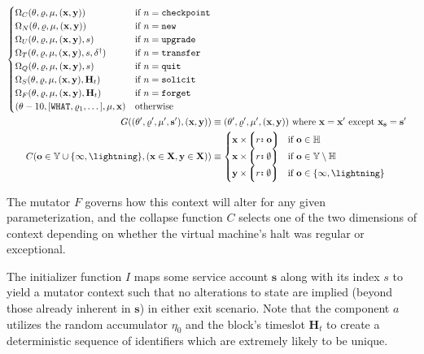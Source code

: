 \begin{align}
\begin{cases}
    \Omega_C(\theta, \varrho, \mu, (\mathbf{x}, \mathbf{y})) &\when n = \mathtt{checkpoint} \\
    \Omega_N(\theta, \varrho, \mu, (\mathbf{x}, \mathbf{y})) &\when n = \mathtt{new} \\
    \Omega_U(\theta, \varrho, \mu, (\mathbf{x}, \mathbf{y}), s) &\when n = \mathtt{upgrade} \\
    \Omega_T(\theta, \varrho, \mu, (\mathbf{x}, \mathbf{y}), s, \delta^\dagger) &\when n = \mathtt{transfer} \\
    \Omega_Q(\theta, \varrho, \mu, (\mathbf{x}, \mathbf{y}), s) &\when n = \mathtt{quit} \\
    \Omega_S(\theta, \varrho, \mu, (\mathbf{x}, \mathbf{y}), \mathbf{H}_t) &\when n = \mathtt{solicit} \\
    \Omega_F(\theta, \varrho, \mu, (\mathbf{x}, \mathbf{y}), \mathbf{H}_t) &\when n = \mathtt{forget} \\
    (\theta - 10, [\mathtt{WHAT}, \varrho_1, \dots], \mu, \mathbf{x}) &\otherwise
  \end{cases} \\
  G((\theta', \varrho', \mu', \mathbf{s}'), (\mathbf{x}, \mathbf{y})) &\equiv (\theta', \varrho', \mu', (\mathbf{x}, \mathbf{y}))\ \where \mathbf{x} = \mathbf{x}' \exc \mathbf{x}_\mathbf{s} = \mathbf{s}' \\
  C(\mathbf{o} \in \mathbb{Y} \cup \{\oog, \panic\}, (\mathbf{x}\in\mathbf{X}, \mathbf{y}\in\mathbf{X})) &\equiv \begin{cases}
    \mathbf{x} \times \tup{\is{r}{\mathbf{o}}} & \when \mathbf{o} \in \mathbb{H} \\
    \mathbf{x} \times \tup{\is{r}{\none}} & \when \mathbf{o} \in \mathbb{Y} \setminus \H \\
    \mathbf{y} \times \tup{\is{r}{\none}} & \when \mathbf{o} \in \{\oog, \panic\} \\
  \end{cases}
\end{align}

The mutator $F$ governs how this context will alter for any given parameterization, and the collapse function $C$ selects one of the two dimensions of context depending on whether the virtual machine's halt was regular or exceptional.

The initializer function $I$ maps some service account $\mathbf{s}$ along with its index $s$ to yield a mutator context such that no alterations to state are implied (beyond those already inherent in $\mathbf{s}$) in either exit scenario. Note that the component $a$ utilizes the random accumulator $\eta_0$ and the block's timeslot $\mathbf{H}_t$ to create a deterministic sequence of identifiers which are extremely likely to be unique.

